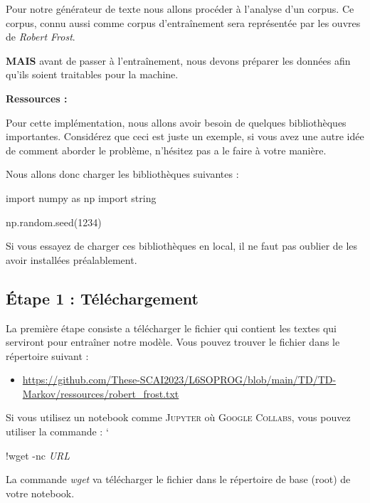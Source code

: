 \vspace{0.5cm}
Pour notre générateur de texte nous allons procéder à l’analyse d'un corpus. Ce corpus, connu aussi comme corpus d'entraînement sera représentée par les ouvres de \textit{Robert Frost}.

\textbf{MAIS} avant de passer à l'entraînement, nous devons préparer les données afin qu'ils soient traitables pour la machine.

\textbf{Ressources : }

Pour cette implémentation, nous allons avoir besoin de quelques bibliothèques importantes. Considérez que ceci est juste un exemple, si vous avez une autre idée de comment aborder le problème, n’hésitez pas a le faire à votre manière.

Nous allons donc charger les bibliothèques suivantes :

\begin{python}
import numpy as np
import string

np.random.seed(1234)
\end{python}

Si vous essayez de charger ces bibliothèques en local, il ne faut pas oublier de les avoir installées préalablement.

\vspace{0.5cm}

\subsection{Étape 1 : Téléchargement}

La première étape consiste a télécharger le fichier qui contient les textes qui serviront pour entraîner notre modèle. Vous pouvez trouver le fichier dans le répertoire suivant :

\begin{itemize}
\item \url{https://github.com/These-SCAI2023/L6SOPROG/blob/main/TD/TD-Markov/ressources/robert_frost.txt}
\end{itemize}

Si vous utilisez un notebook comme \textsc{Jupyter} où \textsc{Google Collabs}, vous pouvez utiliser la commande :
`
\begin{python}
!wget -nc \textit{URL}
\end{python}
 
La commande \textit{wget} va télécharger le fichier dans le répertoire de base (root) de votre notebook. 


